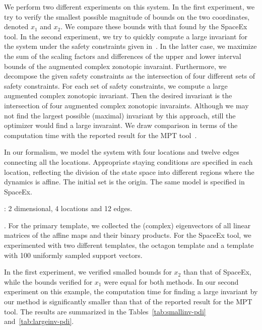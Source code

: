 We perform two different experiments on this system.  In the first
experiment, we try to verify the smallest possible magnitude of bounds
on the two coordinates, denoted $x_1$ and $x_2$. We compare these
bounds with that found by the SpaceEx tool.  In the second experiment,
we try to quickly compute a large invariant for the system under the
safety constraints given in~\cite{rakovic2004computation}.  %
In the latter case, we maximize the sum of the scaling factors and
differences of the upper and lower interval bounds of the augmented
complex zonotopic invaraint.  Furthermore, we decompose the given
safety constraints as the intersection of four different sets of
safety constraints.  For each set of safety constraints, we compute a
large augmented complex zonotopic invariant.  Then the desired
invariant is the intersection of four augmented complex zonotopic
invaraints.  Although we may not find the largest possible (maximal)
invariant by this approach, still the optimizer would find a large
invaraint.  We draw comparison in terms of the computation time with
the reported result for the MPT tool~\cite{rakovic2004computation}.

In our formalism, we model the system with four locations and twelve
edges connecting all the locations.  Appropriate staying conditions
are specified in each location, reflecting the division of the state
space into different regions where the dynamics is affine. The initial
set is the origin.  The same model is specified in SpaceEx.

: 2 dimensional, 4 locations and 12 edges.

.  For the primary template, we collected the
(complex) eigenvectors of all linear matrices of the affine maps and
their binary products. For the SpaceEx tool, we experimented with two
different templates, the octagon template and a template with 100
uniformly sampled support vectors.

  In the first experiment, we verified smalled bounds
for $x_2$ than that of SpaceEx, while the bounds verified for $x_1$
were equal for both methods.  In our second experiment on this
example, the computation time for finding a large invariant by our
method is significantly smaller than that of the reported result for
the MPT tool.  The results are summarized in the
Tables~\ref{tab:smallinv-pdi} and~\ref{tab:largeinv-pdi}.

